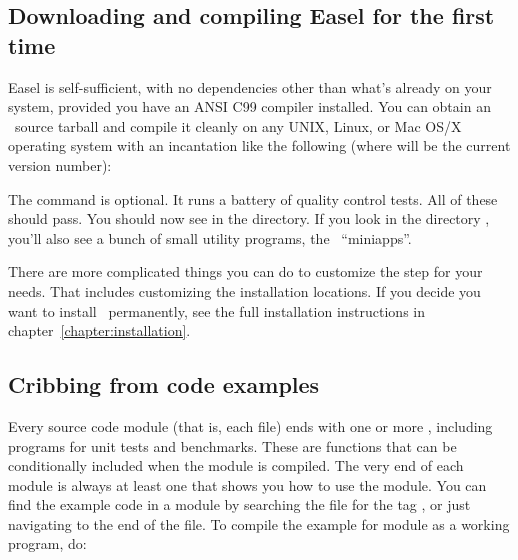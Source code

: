 \subsection{Downloading and compiling Easel for the first time}

Easel is self-sufficient, with no dependencies other than what's
already on your system, provided you have an ANSI C99 compiler
installed.  You can obtain an \Easel\ source tarball and compile it
cleanly on any UNIX, Linux, or Mac OS/X operating system with an
incantation like the following (where  will be the current
version number):

\begin{cchunk}
\end{cchunk}

The  command is optional. It runs a battery of
quality control tests. All of these should pass. You should now see
 in the directory. If you look in the directory
, you'll also see a bunch of small utility programs,
the \Easel\ ``miniapps''.

There are more complicated things you can do to customize the
 step for your needs. That includes customizing the
installation locations. If you decide you want to install
\Easel\ permanently, see the full installation instructions in
chapter~\ref{chapter:installation}.



\subsection{Cribbing from code examples}

Every source code module (that is, each  file) ends with one
or more , including programs for unit tests
and benchmarks. These are  functions that can be
conditionally included when the module is compiled. The very end of
each module is always at least one  that shows
you how to use the module. You can find the example code in a module
 by searching the  file for the tag
, or just navigating to the end of the file. To
compile the example for module  as a working program, do:

\begin{cchunk}
\end{cchunk}

